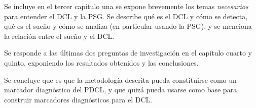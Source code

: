 \documentclass[12pt,letterpaper]{book}
\begin{document}

Se incluye en el tercer capítulo una se expone brevemente los temas \textit{necesarios} para entender el DCL y la PSG. 
%
Se describe qué es el DCL y cómo se detecta, qué es el sueño y cómo se analiza (en particular usando la PSG), y se menciona la relación entre el sueño y el DCL.


Se responde a las últimas dos preguntas de investigación en el capítulo cuarto y quinto, exponiendo los resultados obtenidos y las conclusiones.

Se concluye que es que la metodología descrita pueda constituirse como un marcador diagnóstico del PDCL, y que quizá pueda usarse como base para construir marcadores diagnósticos para el DCL.



\end{document}
